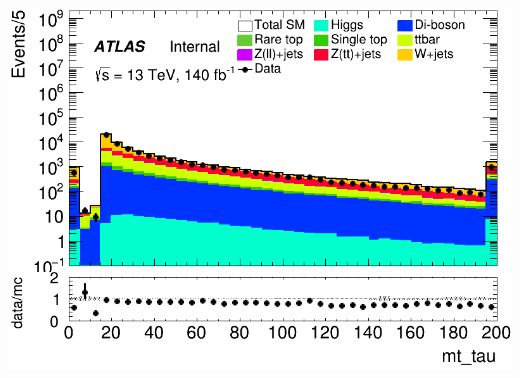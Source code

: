 \documentclass[usenames,dvipsnames]{beamer}
\begin{document}
\begin{frame}
\begin{minipage}{0.32\textwidth}
        \includegraphics[width=\textwidth]{graphics/LH_met/LH_met_mt_tau.png}
    \end{minipage}
    
    \vspace{0.5cm} %


\end{frame}
\end{document}

